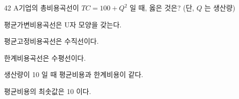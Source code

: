 \begin{question}{42}
A기업의 총비용곡선이 $TC=100+Q^{2}$ 일 때, 옳은 것은? (단, $Q$ 는 생산량)
\begin{choices}
  \item 평균가변비용곡선은 U자 모양을 갖는다.
  \item 평균고정비용곡선은 수직선이다.
  \item 한계비용곡선은 수평선이다.
  \item 생산량이 10 일 때 평균비용과 한계비용이 같다.
  \item 평균비용의 최솟값은 10 이다.
\end{choices}
\end{question}
